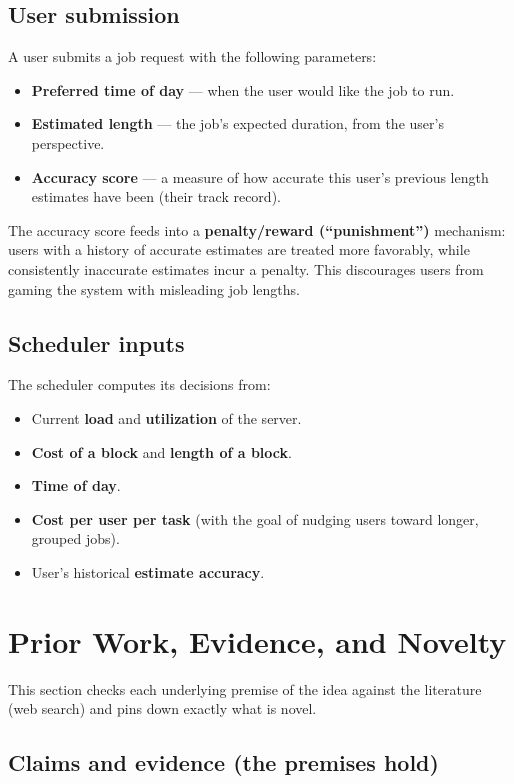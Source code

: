 \documentclass{article}
\begin{document}
\subsection*{User submission}
A user submits a job request with the following parameters:
\begin{itemize}
\item \textbf{Preferred time of day} --- when the user would like the job to run.
\item \textbf{Estimated length} --- the job's expected duration, from the user's perspective.
\item \textbf{Accuracy score} --- a measure of how accurate this user's previous length
estimates have been (their track record).
\end{itemize}

\noindent The accuracy score feeds into a \textbf{penalty/reward (``punishment'')}
mechanism: users with a history of accurate estimates are treated more favorably, while
consistently inaccurate estimates incur a penalty. This discourages users from gaming the
system with misleading job lengths.

\subsection*{Scheduler inputs}
The scheduler computes its decisions from:
\begin{itemize}
\item Current \textbf{load} and \textbf{utilization} of the server.
\item \textbf{Cost of a block} and \textbf{length of a block}.
\item \textbf{Time of day}.
\item \textbf{Cost per user per task} (with the goal of nudging users toward longer, grouped
jobs).
\item User's historical \textbf{estimate accuracy}.
\end{itemize}

\section{Prior Work, Evidence, and Novelty}

This section checks each underlying premise of the idea against the literature
(web search) and pins down exactly what is novel.

\subsection*{Claims and evidence (the premises hold)}
\end{document}
